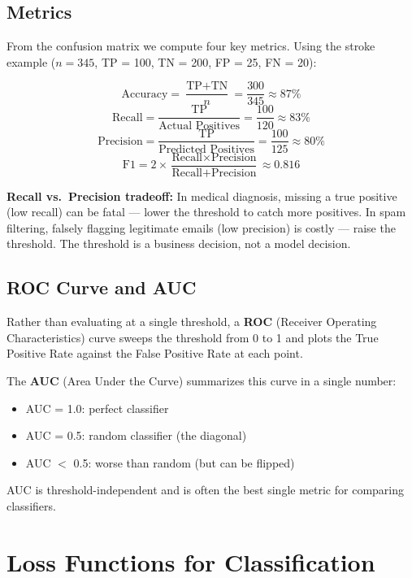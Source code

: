 \documentclass[12pt]{article}
\begin{document}
\subsection{Metrics}

From the confusion matrix we compute four key metrics. Using the stroke example ($n = 345$, TP = 100, TN = 200, FP = 25, FN = 20):

\[
\text{Accuracy} = \frac{\text{TP} + \text{TN}}{n} = \frac{300}{345} \approx 87\%
\]
\[
\text{Recall} = \frac{\text{TP}}{\text{Actual Positives}} = \frac{100}{120} \approx 83\%
\]
\[
\text{Precision} = \frac{\text{TP}}{\text{Predicted Positives}} = \frac{100}{125} \approx 80\%
\]
\[
\text{F1} = 2 \times \frac{\text{Recall} \times \text{Precision}}{\text{Recall} + \text{Precision}} \approx 0.816
\]

\begin{notebox}
\textbf{Recall vs.\ Precision tradeoff:} In medical diagnosis, missing a true positive (low recall) can be fatal --- lower the threshold to catch more positives. In spam filtering, falsely flagging legitimate emails (low precision) is costly --- raise the threshold. The threshold is a business decision, not a model decision.
\end{notebox}

\subsection{ROC Curve and AUC}

Rather than evaluating at a single threshold, a \textbf{ROC} (Receiver Operating Characteristics) curve sweeps the threshold from 0 to 1 and plots the True Positive Rate against the False Positive Rate at each point.

The \textbf{AUC} (Area Under the Curve) summarizes this curve in a single number:
\begin{itemize}
  \item AUC = 1.0: perfect classifier
  \item AUC = 0.5: random classifier (the diagonal)
  \item AUC $<$ 0.5: worse than random (but can be flipped)
\end{itemize}

AUC is threshold-independent and is often the best single metric for comparing classifiers.

\section{Loss Functions for Classification}
\end{document}
